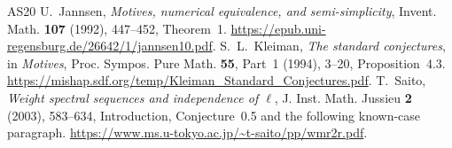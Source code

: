 \begin{thebibliography}{AS20}
U.~Jannsen, \emph{Motives, numerical equivalence, and semi-simplicity},
Invent. Math. \textbf{107} (1992), 447--452, Theorem~1.
\url{https://epub.uni-regensburg.de/26642/1/jannsen10.pdf}.
S.~L.~Kleiman, \emph{The standard conjectures}, in
\emph{Motives}, Proc. Sympos. Pure Math. \textbf{55}, Part~1
(1994), 3--20, Proposition~4.3.
\url{https://mishap.sdf.org/temp/Kleiman_Standard_Conjectures.pdf}.
T.~Saito, \emph{Weight spectral sequences and independence of $\ell$},
J. Inst. Math. Jussieu \textbf{2} (2003), 583--634,
Introduction, Conjecture~0.5 and the following known-case paragraph.
\url{https://www.ms.u-tokyo.ac.jp/~t-saito/pp/wmr2r.pdf}.
\end{thebibliography}
